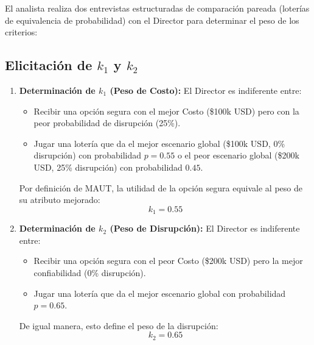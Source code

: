 \documentclass[11pt, letterpaper]{article}
\begin{document}
El analista realiza dos entrevistas estructuradas de comparación pareada (loterías de equivalencia de probabilidad) con el Director para determinar el peso de los criterios:

\subsection{Elicitación de $k_1$ y $k_2$}
\begin{enumerate}
    \item \textbf{Determinación de $k_1$ (Peso de Costo):} El Director es indiferente entre:
    \begin{itemize}
        \item Recibir una opción segura con el mejor Costo (\$100k USD) pero con la peor probabilidad de disrupción (25\%).
        \item Jugar una lotería que da el mejor escenario global (\$100k USD, 0\% disrupción) con probabilidad $p = 0.55$ o el peor escenario global (\$200k USD, 25\% disrupción) con probabilidad $0.45$.
    \end{itemize}
    Por definición de MAUT, la utilidad de la opción segura equivale al peso de su atributo mejorado:
    \begin{equation}
        k_1 = 0.55
    \end{equation}

    \item \textbf{Determinación de $k_2$ (Peso de Disrupción):} El Director es indiferente entre:
    \begin{itemize}
        \item Recibir una opción segura con el peor Costo (\$200k USD) pero la mejor confiabilidad (0\% disrupción).
        \item Jugar una lotería que da el mejor escenario global con probabilidad $p = 0.65$.
    \end{itemize}
    De igual manera, esto define el peso de la disrupción:
    \begin{equation}
        k_2 = 0.65
    \end{equation}
\end{enumerate}
\end{document}
